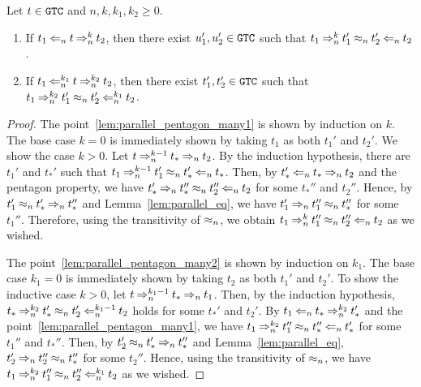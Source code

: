 \begin{lemma}\label{lem:parallel_pentagon_many}
  Let $t \in {\tt GTC}$ and $n,k,k_1,k_2\ge 0$. 
  \begin{enumerate}
  \item\label{lem:parallel_pentagon_many1}
    If $t_1 \mathbin{\Leftarrow_{n}} t \mathbin{\Rightarrow_{n}^{k}} t_2$,
    then there exist $u_1',u_2'\in {\tt GTC}$
    such that $t_1 \mathbin{\Rightarrow_{n}^{k}} t_1' \mathbin{\approx_{n}} t_2' \mathbin{\Leftarrow_{n}} t_2$.
  \item\label{lem:parallel_pentagon_many2}
    If $t_1 \mathbin{\Leftarrow_{n}^{k_1}} t \mathbin{\Rightarrow_{n}^{k_2}} t_2$,
    then there exist $t_1',t_2'\in {\tt GTC}$
    such that $t_1 \mathbin{\Rightarrow_{n}^{k_2}} t_1' \mathbin{\approx_{n}} t_2' \mathbin{\Leftarrow_{n}^{k_1}} t_2$.
  \end{enumerate}
\end{lemma}
\begin{proof}
  The point~\ref{lem:parallel_pentagon_many1} is shown by induction on $k$.
  The base case $k=0$ is immediately shown by taking $t_1$ as both $t_1'$ and $t_2'$.
  We show the case $k>0$.
  Let $t \mathbin{\Rightarrow_{n}^{k-1}} t_* \mathbin{\Rightarrow_{n}} t_2$.
  By the induction hypothesis, there are $t_1'$ and $t_*'$ such that 
  $t_1 \mathbin{\Rightarrow_{n}^{k-1}} t_1' \mathbin{\approx_{n}} t_*' \mathbin{\Leftarrow_{n}} t_*$.
  Then, by $t_*' \mathbin{\Leftarrow_{n}} t_* \mathbin{\Rightarrow_{n}} t_2$ and the pentagon property,
  we have $t_*' \mathbin{\Rightarrow_{n}} t_*'' \mathbin{\approx_{n}} t_2'' \mathbin{\Leftarrow_{n}} t_2$ for some $t_*''$ and $t_2''$. 
  Hence, by $t_1' \mathbin{\approx_{n}} t_*' \mathbin{\Rightarrow_{n}} t_*''$ and Lemma~\ref{lem:parallel_eq},
  we have $t_1' \mathbin{\Rightarrow_{n}} t_1'' \mathbin{\approx_{n}} t_*''$ for some $t_1''$.
  Therefore, using the transitivity of $\mathbin{\approx_{n}}$,
  we obtain $t_1 \mathbin{\Rightarrow_{n}^{k}} t_1'' \mathbin{\approx_{n}} t_2'' \mathbin{\Leftarrow_{n}} t_2$ as we wished. 
  
  The point~\ref{lem:parallel_pentagon_many2} is shown by induction on $k_1$.  
  The base case $k_1=0$ is immediately shown by taking $t_2$ as both $t_1'$ and $t_2'$.
  To show the inductive case $k>0$, let $t \mathbin{\Rightarrow_{n}^{k_1-1}} t_* \mathbin{\Rightarrow_{n}} t_1$.
  Then, by the induction hypothesis,
  $t_* \mathbin{\Rightarrow_{n}^{k_2}} t_*' \mathbin{\approx_{n}} t_2' \mathbin{\Leftarrow_{n}^{k_1-1}} t_2$ holds
  for some $t_*'$ and $t_2'$. 
  By $t_1 \mathbin{\Leftarrow_{n}} t_* \mathbin{\Rightarrow_{n}^{k_2}} t_*'$ and the point~\ref{lem:parallel_pentagon_many1},
  we have $t_1 \mathbin{\Rightarrow_{n}^{k_2}} t_1'' \mathbin{\approx_{n}} t_*'' \mathbin{\Leftarrow_{n}} t_*'$
  for some $t_1''$ and $t_*''$. 
  Then, by $t_2' \mathbin{\approx_{n}} t_*' \mathbin{\Rightarrow_{n}} t_*''$ and Lemma~\ref{lem:parallel_eq},
  $t_2' \mathbin{\Rightarrow_{n}} t_2'' \mathbin{\approx_{n}} t_*''$ for some $t_2''$.
  Hence, using the transitivity of $\mathbin{\approx_{n}}$, we have
  $t_1 \mathbin{\Rightarrow_{n}^{k_2}} t_1'' \mathbin{\approx_{n}} t_2'' \mathbin{\Leftarrow_{n}^{k_1}} t_2$ as we wished.
\end{proof}

